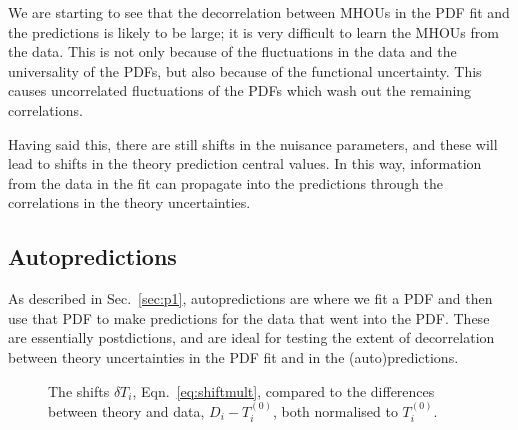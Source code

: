 We are starting to see that the decorrelation between MHOUs in the PDF fit and the predictions is likely to be large; it is very difficult to learn the MHOUs from the data. This is not only because of the fluctuations in the data and the universality of the PDFs, but also because of the functional uncertainty. This causes uncorrelated fluctuations of the PDFs which wash out the remaining correlations. 

Having said this, there are still shifts in the nuisance parameters, and these will lead to shifts in the theory prediction central values. In this way, information from the data in the fit can propagate into the predictions through the correlations in the theory uncertainties. 

\subsection{Autopredictions}
As described in Sec.~\ref{sec:p1}, autopredictions are where we fit a PDF and then use that PDF to make predictions for the data that went into the PDF. These are essentially postdictions, and are ideal for testing the extent of decorrelation between theory uncertainties in the PDF fit and in the (auto)predictions. 
\begin{figure}[H]
    \begin{center}
    \end{center}
  \vspace{-0.55cm}
  \caption{The shifts $\delta T_i$, Eqn.~\ref{eq:shiftmult}, compared to the differences between theory and data, $D_i-T^{(0)}_i$, both normalised to $T^{(0)}_i$.} 
  \label{fig:shifts}
\end{figure}
